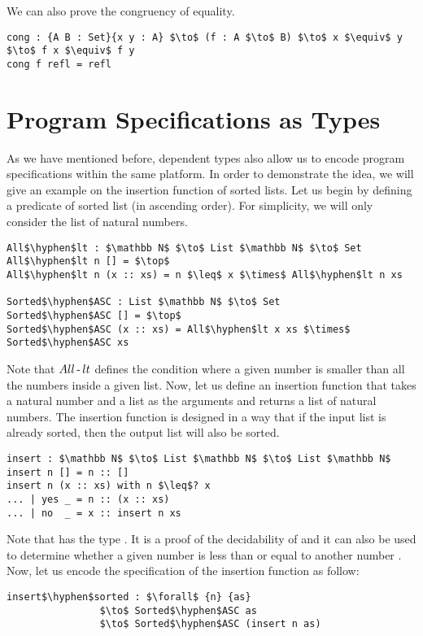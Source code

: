 \par We can also prove the congruency of equality.
\begin{lstlisting}[mathescape=true,xleftmargin=.3\textwidth]
cong : {A B : Set}{x y : A} $\to$ (f : A $\to$ B) $\to$ x $\equiv$ y $\to$ f x $\equiv$ f y
cong f refl = refl
\end{lstlisting}


\section{Program Specifications as Types}
\par As we have mentioned before, dependent types also allow us to encode program
specifications within the same platform. In order to demonstrate the
idea, we will give an example on the insertion function of sorted
lists. Let us begin by defining a predicate
of sorted list (in ascending order). For simplicity, we will only consider the list of natural
numbers. 
\begin{lstlisting}[mathescape=true,xleftmargin=.3\textwidth]
All$\hyphen$lt : $\mathbb N$ $\to$ List $\mathbb N$ $\to$ Set
All$\hyphen$lt n [] = $\top$
All$\hyphen$lt n (x :: xs) = n $\leq$ x $\times$ All$\hyphen$lt n xs

Sorted$\hyphen$ASC : List $\mathbb N$ $\to$ Set
Sorted$\hyphen$ASC [] = $\top$
Sorted$\hyphen$ASC (x :: xs) = All$\hyphen$lt x xs $\times$ Sorted$\hyphen$ASC xs
\end{lstlisting}

\par Note that \(All\operatorname{-} lt\) defines the condition where a given
number is smaller than all the numbers inside a given list. Now, let
us define an insertion function that takes a natural number and a list as the arguments and returns a list of
natural numbers. The insertion function is designed in a way that if the
input list is already sorted, then the output list will also be sorted. 
\begin{lstlisting}[mathescape=true,xleftmargin=.3\textwidth]
insert : $\mathbb N$ $\to$ List $\mathbb N$ $\to$ List $\mathbb N$
insert n [] = n :: []
insert n (x :: xs) with n $\leq$? x
... | yes _ = n :: (x :: xs)
... | no  _ = x :: insert n xs
\end{lstlisting}

\par Note that  has the type . It is a proof of the decidability of \mb{\leq} and it can also be used to determine whether
a given number  is less than or equal to another number
. Now, let us encode the specification of the insertion function
as follow: 
\begin{lstlisting}[mathescape=true,xleftmargin=.3\textwidth]
insert$\hyphen$sorted : $\forall$ {n} {as} 
                $\to$ Sorted$\hyphen$ASC as 
                $\to$ Sorted$\hyphen$ASC (insert n as)
\end{lstlisting}

